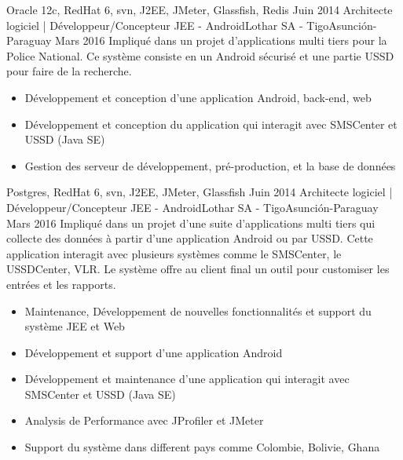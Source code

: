 \begin{experiences}
{\begin{itemize}
                      \end{itemize}
                 }
                 {Oracle 12c, RedHat 6, svn, J2EE, JMeter, Glassfish, Redis}
  \emptySeparator
  \projectexperiences
    {Juin 2014}  {Architecte logiciel | Développeur/Concepteur JEE - Android}{Lothar SA - Tigo}{Asunción-Paraguay}
    {Mars 2016}
                 {Impliqué dans un projet d'applications multi tiers pour la Police National. Ce système
                 consiste en un Android sécurisé et une partie USSD pour faire de la recherche.
                }
                 {
                      \begin{itemize}
                        \item Développement et conception d'une application Android, back-end, web
                        \item Développement et conception du application qui interagit avec SMSCenter et USSD (Java SE)
                        \item Gestion des serveur de développement, pré-production, et la base de données
                      \end{itemize}
                 }
                 {Postgres, RedHat 6, svn, J2EE, JMeter, Glassfish}
  \emptySeparator
  \projectexperiences
    {Juin 2014}  {Architecte logiciel | Développeur/Concepteur JEE - Android}{Lothar SA - Tigo}{Asunción-Paraguay}
    {Mars 2016}
                 {Impliqué dans un projet d'une suite d'applications multi tiers qui collecte des données à partir
                 d'une application Android ou par USSD. Cette application interagit avec plusieurs systèmes comme
                 le SMSCenter, le USSDCenter, VLR. Le système offre au client final un outil pour customiser les
                 entrées et les rapports.
                  }
                 {
                      \begin{itemize}
                        \item Maintenance, Développement de nouvelles fonctionnalités et support du système JEE et Web
                        \item Développement et support d'une application Android
                        \item Développement et maintenance d’une application qui interagit avec SMSCenter et USSD (Java SE)
                        \item Analysis de Performance avec JProfiler et JMeter
                        \item Support du système dans different pays comme Colombie, Bolivie, Ghana

\end{itemize}}
\end{experiences}
